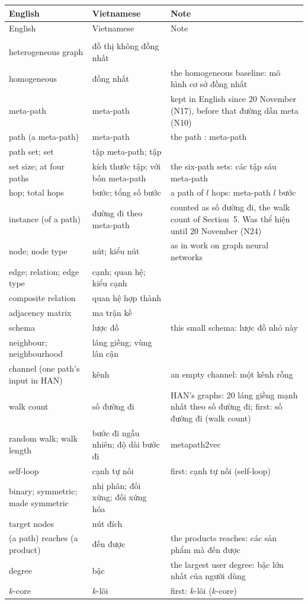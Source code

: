 \documentclass[11pt,a4paper]{article}
\makeatletter
\DeclareRobustCommand{\code}[1]{\texttt{\detokenize{#1}}}
\newcommand{\vi}[1]{\foreignlanguage{vietnamese}{#1}}
\newcommand{\g}[3]{#1 & \vi{#2} & #3 \\}
\newcommand{\grp}[1]{\addlinespace[6pt]\multicolumn{3}{@{}l}{\textbf{#1}} \\ \addlinespace[2pt]}
\makeatother
\begin{document}
{\small
\begin{longtable}{@{}>{\raggedright\arraybackslash}p{}%
  >{\raggedright\arraybackslash}p{}%
  >{\raggedright\arraybackslash}p{}@{}}
  \toprule
  English & Vietnamese & Note \\
  \midrule
  \endfirsthead
  \toprule
  English & Vietnamese & Note \\
  \midrule
  \endhead
  \bottomrule
  \endfoot
  \grp{A. The task and the graph}
  \g{heterogeneous graph}{đồ thị không đồng nhất}{}
  \g{homogeneous}{đồng nhất}{the homogeneous baseline: \vi{mô hình cơ sở đồng nhất}}
  \g{meta-path}{meta-path}{kept in English since 20 November (N17), before that \vi{đường dẫn meta} (N10)}
  \g{path (a meta-path)}{meta-path}{the path \code{PUP}: \vi{meta-path \code{PUP}}}
  \g{path set; set}{tập meta-path; tập}{}
  \g{set size; at four paths}{kích thước tập; với bốn meta-path}{the six-path sets: \vi{các tập
    sáu meta-path}}
  \g{hop; total hops}{bước; tổng số bước}{a path of $l$ hops: \vi{meta-path $l$ bước}}
  \g{instance (of a path)}{đường đi theo meta-path}{counted as \vi{số đường đi}, the walk count
    of Section~5. Was \vi{thể hiện} until 20 November (N24)}
  \g{node; node type}{nút; kiểu nút}{as in work on graph neural networks}
  \g{edge; relation; edge type}{cạnh; quan hệ; kiểu cạnh}{}
  \g{composite relation}{quan hệ hợp thành}{}
  \g{adjacency matrix}{ma trận kề}{}
  \g{schema}{lược đồ}{this small schema: \vi{lược đồ nhỏ này}}
  \g{neighbour; neighbourhood}{láng giềng; vùng lân cận}{}
  \g{channel (one path's input in HAN)}{kênh}{an empty channel: \vi{một kênh rỗng}}
  \g{walk count}{số đường đi}{HAN's graphs: \vi{20 láng giềng mạnh nhất theo số đường đi};
    first: \vi{số đường đi (walk count)}}
  \g{random walk; walk length}{bước đi ngẫu nhiên; độ dài bước đi}{metapath2vec}
  \g{self-loop}{cạnh tự nối}{first: \vi{cạnh tự nối (self-loop)}}
  \g{binary; symmetric; made symmetric}{nhị phân; đối xứng; đối xứng hóa}{}
  \g{target nodes}{nút đích}{}
  \g{(a path) reaches (a product)}{đến được}{the products \code{PCCP} reaches: \vi{các sản phẩm
    mà \code{PCCP} đến được}}
  \g{degree}{bậc}{the largest user degree: \vi{bậc lớn nhất của người dùng}}
  \g{$k$-core}{$k$-lõi}{first: \vi{$k$-lõi ($k$-core)}}


\end{longtable}}
\end{document}
